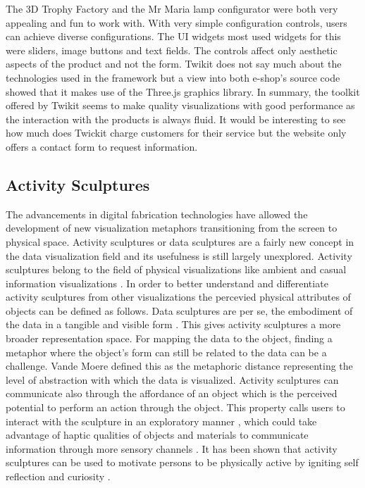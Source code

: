 \documentclass[../medieninformatik-arbeit.tex]{subfiles}
\begin{document}
The 3D Trophy Factory and the Mr Maria lamp configurator were both very appealing and fun to work with. With very simple configuration controls, users can achieve diverse configurations. The UI widgets most used widgets for this were sliders, image buttons and text fields. The controls affect only aesthetic aspects of the product and not the form. Twikit does not say much about the technologies used in the framework but a view into both e-shop's source code showed that it makes use of the Three.js \cite{cabello2010three} graphics library. In summary, the toolkit offered by Twikit seems to make quality visualizations with good performance as the interaction with the products is always fluid. It would be interesting to see how much does Twickit charge customers for their service but the website only offers a contact form to request information.    

\subsection{Activity Sculptures}
\label{sec:activitysculptures}
The advancements in digital fabrication technologies have allowed the development of new visualization metaphors transitioning from the screen to physical space. Activity sculptures or data sculptures are a fairly new concept in the data visualization field and its usefulness is still largely unexplored. Activity sculptures belong to the field of physical visualizations like ambient and casual information visualizations \cite{jansen2013evaluating}. In order to better understand and differentiate activity sculptures from other visualizations the percevied physical attributes of objects can be defined as follows. 
Data sculptures are per se, the embodiment of the data in a tangible and visible form \cite{zhao2008embodiment}. This gives activity sculptures a more broader representation space. For mapping the data to the object, finding a metaphor where the object's form can still be related to the data can be a challenge. Vande Moere defined this as the metaphoric distance \cite{vande2009analyzing} representing the level of abstraction with which the data is visualized. Activity sculptures can communicate also through the affordance of an object which is the perceived potential to perform an action through the object. This property calls users to interact with the sculpture in an exploratory manner \cite{jansen2013evaluating,vande2008beyond}, which could take advantage of haptic qualities of objects and materials to communicate information through more sensory channels \cite{bara2004visuo}. It has been shown that activity sculptures can be used to motivate persons to be physically active by igniting self reflection and curiosity \cite{stusak2014activity}.
\end{document}
